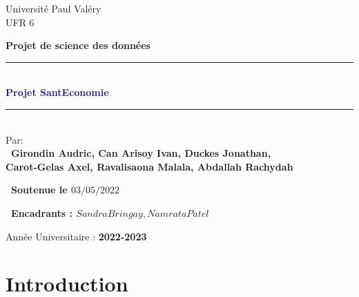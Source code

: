 \documentclass[12pt,a4paper]{report}
\begin{document}
\begin{titlepage}
\begin{center}
\medskip
{\Large{Universit\'{e} Paul Val\'{e}ry }}\\
\textsc{UFR 6}\\
 \vskip0.5cm
  \noindent {\textsc{\LARGE \textcolor{MidnightBlue}{Licence MIASHS}}\\[1cm]}
\end{center}
\vskip0.5cm
\begin{center}
\textbf{Projet de science des donn\'{e}es}\\
\vskip0.5cm
\newcommand{\HRule}{\rule{\linewidth}{0.5mm}} 
	\HRule\\[0.2cm]
	{\huge\bfseries\textcolor{MidnightBlue}{Projet SantEconomie\\[0.2cm]}}
	\HRule\\[1cm]
Par: \\
\small \bf{\ Girondin Audric, Can Arisoy Ivan, Duckes Jonathan, \\ Carot-Gelas Axel, Ravalisaona Malala, Abdallah Rachydah}
\end{center}
  \vspace{3mm}
  \centerline {\small \bf{\ Soutenue le $03/05/2022$}}
  \vspace{3mm}
  \centerline {\small \bf{\ Encadrants : $Sandra Bringay, Namrata Patel$}} 
\vskip2.5cm
\begin{center}
{\small{Année Universitaire : \textbf{2022-2023}}} \\
\end{center}

\end{titlepage}

\newpage
    \tableofcontents %
    
\chapter{Introduction}
\end{document}
